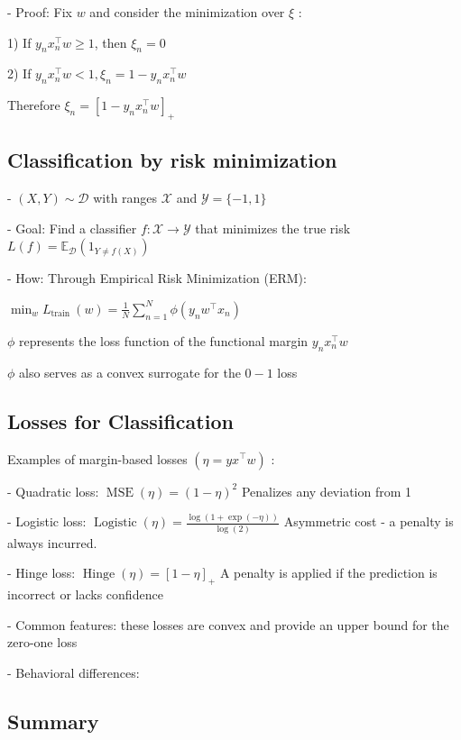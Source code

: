  
- Proof: Fix $w$ and consider the minimization over $\xi$ :

1) If $y_{n} x_{n}^{\top} w \geq 1$, then $\xi_{n}=0$

2) If $y_{n} x_{n}^{\top} w<1, \xi_{n}=1-y_{n} x_{n}^{\top} w$

Therefore $\xi_{n}=\left[1-y_{n} x_{n}^{\top} w\right]_{+}$


\subsection*{Classification by risk minimization}
- $(X, Y) \sim \mathscr{D}$ with ranges $\mathscr{X}$ and $\mathscr{Y}=\{-1,1\}$

- Goal: Find a classifier $f: \mathscr{X} \rightarrow \mathcal{Y}$ that minimizes the true risk
$
L(f)=\mathbb{E}_{\mathscr{D}}\left(1_{Y \neq f(X)}\right)
$

- How: Through Empirical Risk Minimization (ERM):

$
\min _{w} L_{\text {train }}(w)=\frac{1}{N} \sum_{n=1}^{N} \phi\left(y_{n} w^{\top} x_{n}\right)
$

$\phi$ represents the loss function of the functional margin $y_{n} x_{n}^{\top} w$

$\phi$ also serves as a convex surrogate for the $0-1$ loss

\subsection*{Losses for Classification}
Examples of margin-based losses $\left(\eta=y x^{\top} w\right)$ :

- Quadratic loss: $\operatorname{MSE}(\eta)=(1-\eta)^{2}$ Penalizes any deviation from 1

- Logistic loss: $\operatorname{Logistic}(\eta)=\frac{\log (1+\exp (-\eta))}{\log (2)}$ Asymmetric cost - a penalty is always incurred.

- Hinge loss: $\operatorname{Hinge}(\eta)=[1-\eta]_{+}$ A penalty is applied if the prediction is incorrect or lacks confidence

- Common features: these losses are convex and provide an upper bound for the zero-one loss

- Behavioral differences:


\subsection*{Summary}

